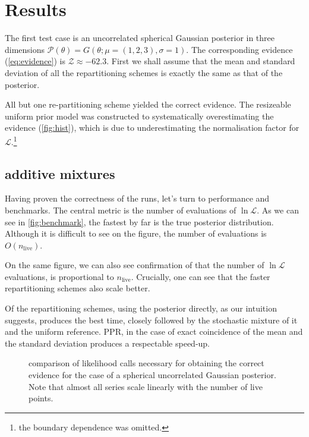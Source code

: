 \documentclass[usenatbib]{mnras}
\begin{document}
\section{Results}
\label{sec:org04eab48}
The first test case is an uncorrelated spherical Gaussian posterior
in three dimensions \(\mathcal{P}(\theta) = G(\theta; \mu = (1,2,3),
  \sigma = 1)\). The corresponding evidence (\autoref{eq:evidence}) is
\(\mathcal{Z}\approx-62.3\). First we shall assume that the mean and
standard deviation of all the repartitioning schemes is exactly the
same as that of the posterior. 

All but one re-partitioning scheme yielded the correct
evidence. The resizeable uniform prior model was constructed to
systematically overestimating the evidence (\autoref{fig:hist}),
which is due to underestimating the normalisation factor for
\(\mathcal{L}\).\footnote{the boundary dependence was omitted.}




\subsection{additive mixtures}
\label{sec:org08ae224}

Having proven the correctness of the runs, let's turn to
performance and benchmarks. The central metric is the number of
evaluations of \(\ln \mathcal{L}\). As we can see in
\autoref{fig:benchmark}, the fastest by far is the true posterior
distribution. Although it is difficult to see on the figure, the
number of evaluations is \(O(n_\text{live})\). 

On the same figure, we can also see confirmation of that the number
of \(\ln \mathcal{L}\) evaluations, is proportional to
\(n_\text{live}\). Crucially, one can see that the faster
repartitioning schemes also scale better. 

Of the repartitioning schemes, using the posterior directly, as our
intuition suggests, produces the best time, closely followed by the
stochastic mixture of it and the uniform reference. PPR, in the
case of exact coincidence of the mean and the standard deviation
produces a respectable speed-up. 

\begin{figure}
  
\caption{\label{orgdb0a221}
comparison of likelihood calls necessary for obtaining the correct evidence for the case of a spherical uncorrelated Gaussian posterior. Note that almost all series scale linearly with the number of live points.}
\end{figure}
\end{document}
